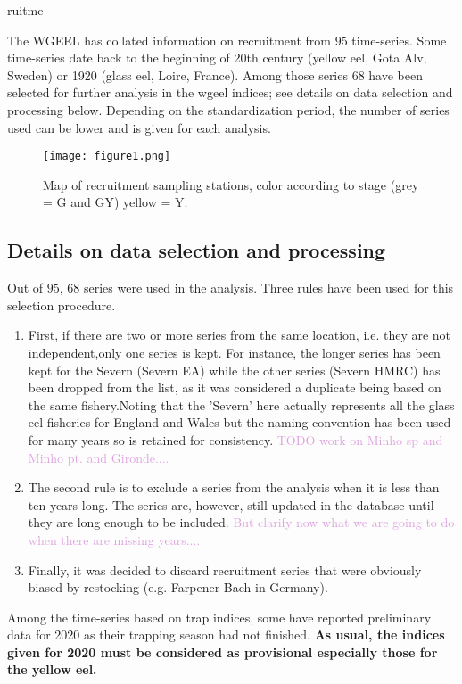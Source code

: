 ruitme\documentclass[pdftex,11pt,a4paper]{report}
\begin{document}
The WGEEL has collated information on recruitment from
$95$ time-series. Some time-series date back to the
beginning of 20th century (yellow eel, Gota Alv, Sweden) or 1920 (glass eel,
Loire, France). Among those series $68$ have been
selected for further analysis in the wgeel indices; see details on data
selection and processing below. Depending on the standardization period, the number of series  used can be lower and is given for
each analysis. 

\begin{figure}[htbp]
\centering
\texttt{[image: figure1.png]}
\caption{Map of recruitment sampling stations, color according to stage (grey =
G and GY) yellow = Y.}
\label{figure1}
\end{figure}

\subsection{Details on data selection and processing}

Out of $95$, 
$68$ series were used in the analysis. Three
rules have been used for this selection procedure.
\begin{enumerate}
\item First, if there are two or more series from the same location, i.e. they are not independent,only one series is kept. For instance, the longer series has been kept for the Severn (Severn EA) while the other series (Severn HMRC) has been dropped from the list, as it was considered a duplicate being based on the same fishery.Noting that the 'Severn' here actually represents all the glass eel fisheries for England and Wales but the naming convention has been used for many
years so is retained for consistency.
\textcolor{Plum}{TODO work on Minho sp and Minho
pt. and Gironde....}
\item The second rule is to exclude a series from the analysis when it is less than ten years long. The series are, however, still updated in the database until they are long enough to be included. \textcolor{Plum}{But clarify now what we are going to do
when there are missing years....} 
\item Finally, it was decided to discard recruitment series that were obviously biased by restocking (e.g. Farpener Bach in Germany).
\end{enumerate}


Among the time-series based on trap indices, some have reported
preliminary data for 2020 as their trapping season had not
finished. \textbf{As usual, the indices given for 2020 must be considered
as provisional especially those for the yellow eel.}
\end{document}
